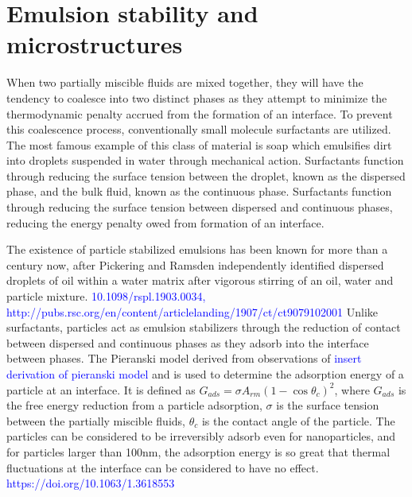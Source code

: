 \section{Emulsion stability and microstructures}

When two partially miscible fluids are mixed together, they will have the tendency to coalesce into two distinct phases as they attempt to minimize the thermodynamic penalty accrued from the formation of an interface. To prevent this coalescence process, conventionally small molecule surfactants are utilized. The most famous example of this class of material is soap which emulsifies dirt into droplets suspended in water through mechanical action. Surfactants function through reducing the surface tension between the droplet, known as the dispersed phase, and the bulk fluid, known as the continuous phase. Surfactants function through reducing the surface tension between dispersed and continuous phases, reducing the energy penalty owed from formation of an interface.

The existence of particle stabilized emulsions has been known for more than a century now, after Pickering and Ramsden independently identified dispersed droplets of oil within a water matrix after vigorous stirring of an oil, water and particle mixture. \textcolor{blue}{10.1098/rspl.1903.0034, http://pubs.rsc.org/en/content/articlelanding/1907/ct/ct9079102001} Unlike surfactants, particles act as emulsion stabilizers through the reduction of contact between dispersed and continuous phases as they adsorb into the interface between phases. The Pieranski model derived from observations of \textcolor{blue}{insert derivation of pieranski model} and is used to determine the adsorption energy of a particle at an interface. It is defined as $G_{ads} = \sigma A_{rm} (1 - \cos{\theta_c})^2$, where $G_{ads}$ is the free energy reduction from a particle adsorption, $\sigma$ is the surface tension between the partially miscible fluids, $\theta_c$ is the contact angle of the particle. The particles can be considered to be irreversibly adsorb even for nanoparticles, and for particles larger than 100nm, the adsorption energy is so great that thermal fluctuations at the interface can be considered to have no effect. \textcolor{blue}{https://doi.org/10.1063/1.3618553} 

